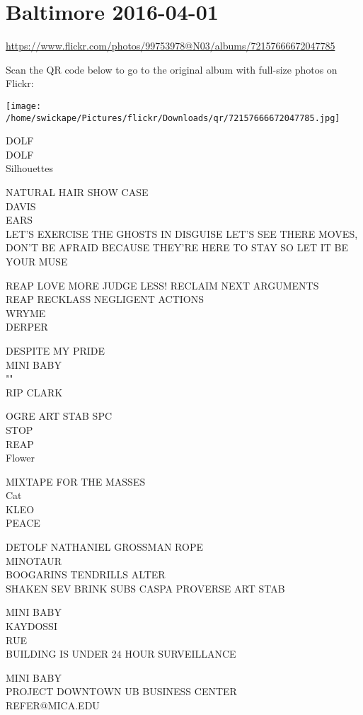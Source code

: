 \documentclass[10pt,letterpaper]{article}
\begin{document}
\section*{Baltimore 2016-04-01}

\url{https://www.flickr.com/photos/99753978@N03/albums/72157666672047785}

Scan the QR code below to go to the original album with full-size photos on Flickr:

\texttt{[image: /home/swickape/Pictures/flickr/Downloads/qr/72157666672047785.jpg]}


DOLF\\
DOLF\\
Silhouettes

NATURAL HAIR SHOW CASE\\
DAVIS\\
EARS\\
LET'S EXERCISE THE GHOSTS IN DISGUISE LET'S SEE THERE MOVES, DON'T BE AFRAID BECAUSE THEY'RE HERE TO STAY SO LET IT BE YOUR MUSE

REAP LOVE MORE JUDGE LESS! RECLAIM NEXT ARGUMENTS\\
REAP RECKLASS NEGLIGENT ACTIONS\\
WRYME\\
DERPER

DESPITE MY PRIDE\\
MINI BABY\\
""\\
RIP CLARK

OGRE ART STAB SPC\\
STOP\\
REAP\\
Flower

MIXTAPE FOR THE MASSES\\
Cat\\
KLEO\\
PEACE

DETOLF NATHANIEL GROSSMAN ROPE\\
MINOTAUR\\
BOOGARINS TENDRILLS ALTER\\
SHAKEN SEV BRINK SUBS CASPA PROVERSE ART STAB

MINI BABY\\
KAYDOSSI\\
RUE\\
BUILDING IS UNDER 24 HOUR SURVEILLANCE

MINI BABY\\
PROJECT DOWNTOWN UB BUSINESS CENTER\\
REFER@MICA.EDU
\end{document}
